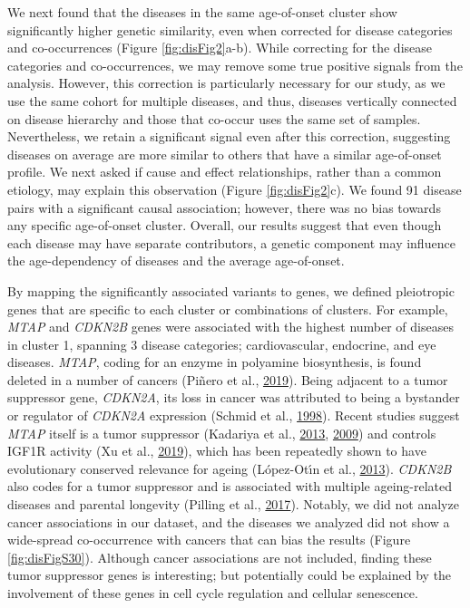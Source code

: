 \documentclass[12pt,twoside]{unicam}
\begin{document}
We next found that the diseases in the same age-of-onset cluster show significantly higher genetic similarity, even when corrected for disease categories and co-occurrences (Figure \ref{fig:disFig2}a-b). While correcting for the disease categories and co-occurrences, we may remove some true positive signals from the analysis. However, this correction is particularly necessary for our study, as we use the same cohort for multiple diseases, and thus, diseases vertically connected on disease hierarchy and those that co-occur uses the same set of samples. Nevertheless, we retain a significant signal even after this correction, suggesting diseases on average are more similar to others that have a similar age-of-onset profile. We next asked if cause and effect relationships, rather than a common etiology, may explain this observation (Figure \ref{fig:disFig2}c). We found 91 disease pairs with a significant causal association; however, there was no bias towards any specific age-of-onset cluster. Overall, our results suggest that even though each disease may have separate contributors, a genetic component may influence the age-dependency of diseases and the average age-of-onset.

By mapping the significantly associated variants to genes, we defined pleiotropic genes that are specific to each cluster or combinations of clusters. For example, \emph{MTAP} and \emph{CDKN2B} genes were associated with the highest number of diseases in cluster 1, spanning 3 disease categories; cardiovascular, endocrine, and eye diseases. \emph{MTAP}, coding for an enzyme in polyamine biosynthesis, is found deleted in a number of cancers (Piñero et al., \protect\hyperlink{ref-Pinero2019}{2019}). Being adjacent to a tumor suppressor gene, \emph{CDKN2A}, its loss in cancer was attributed to being a bystander or regulator of \emph{CDKN2A} expression (Schmid et al., \protect\hyperlink{ref-Schmid1998}{1998}). Recent studies suggest \emph{MTAP} itself is a tumor suppressor (Kadariya et al., \protect\hyperlink{ref-Kadariya2013}{2013}, \protect\hyperlink{ref-Kadariya2009}{2009}) and controls IGF1R activity (Xu et al., \protect\hyperlink{ref-Xu2019}{2019}), which has been repeatedly shown to have evolutionary conserved relevance for ageing (López-Otı́n et al., \protect\hyperlink{ref-Lopez-Otin2013}{2013}). \emph{CDKN2B} also codes for a tumor suppressor and is associated with multiple ageing-related diseases and parental longevity (Pilling et al., \protect\hyperlink{ref-Pilling2017}{2017}). Notably, we did not analyze cancer associations in our dataset, and the diseases we analyzed did not show a wide-spread co-occurrence with cancers that can bias the results (Figure \ref{fig:disFigS30}). Although cancer associations are not included, finding these tumor suppressor genes is interesting; but potentially could be explained by the involvement of these genes in cell cycle regulation and cellular senescence.
\end{document}
